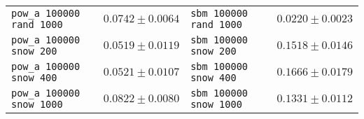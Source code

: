 \begin{table*}
\begin{tabular}{lc|lc}
\texttt{pow\_a 100000 rand 1000} & $0.0742 \pm 0.0064$ & \texttt{sbm 100000 rand 1000} & $0.0220 \pm 0.0023$ \\
\texttt{pow\_a 100000 snow 200} & $0.0519 \pm 0.0119$ & \texttt{sbm 100000 snow 200} & $0.1518 \pm 0.0146$ \\
\texttt{pow\_a 100000 snow 400} & $0.0521 \pm 0.0107$ & \texttt{sbm 100000 snow 400} & $0.1666 \pm 0.0179$ \\
\texttt{pow\_a 100000 snow 1000} & $0.0822 \pm 0.0080$ & \texttt{sbm 100000 snow 1000} & $0.1331 \pm 0.0112$ \\
\bottomrule
\end{tabular}
\end{table*}
